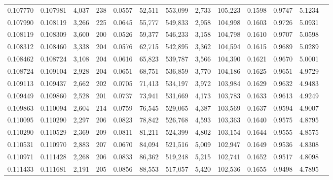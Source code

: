 \begin{tabular}{rrrrrrrrrrrrr}
0.107770 & 0.107981 & 4,037 & 238 &                                     0.0557 &  52,511 & 553,099 &   2,733 & 105,223 & 0.1598 & 0.9747 & 5.1234 \\
0.107990 & 0.108119 & 3,266 & 225 &                                     0.0645 &  55,777 & 549,833 &   2,958 & 104,998 & 0.1603 & 0.9726 & 5.0931 \\
0.108119 & 0.108309 & 3,600 & 200 &                                     0.0526 &  59,377 & 546,233 &   3,158 & 104,798 & 0.1610 & 0.9707 & 5.0598 \\
0.108312 & 0.108460 & 3,338 & 204 &                                     0.0576 &  62,715 & 542,895 &   3,362 & 104,594 & 0.1615 & 0.9689 & 5.0289 \\
0.108462 & 0.108724 & 3,108 & 204 &                                     0.0616 &  65,823 & 539,787 &   3,566 & 104,390 & 0.1621 & 0.9670 & 5.0001 \\
0.108724 & 0.109104 & 2,928 & 204 &                                     0.0651 &  68,751 & 536,859 &   3,770 & 104,186 & 0.1625 & 0.9651 & 4.9729 \\
0.109113 & 0.109437 & 2,662 & 202 &                                     0.0705 &  71,413 & 534,197 &   3,972 & 103,984 & 0.1629 & 0.9632 & 4.9483 \\
0.109449 & 0.109860 & 2,528 & 201 &                                     0.0737 &  73,941 & 531,669 &   4,173 & 103,783 & 0.1633 & 0.9613 & 4.9249 \\
0.109863 & 0.110094 & 2,604 & 214 &                                     0.0759 &  76,545 & 529,065 &   4,387 & 103,569 & 0.1637 & 0.9594 & 4.9007 \\
0.110095 & 0.110290 & 2,297 & 206 &                                     0.0823 &  78,842 & 526,768 &   4,593 & 103,363 & 0.1640 & 0.9575 & 4.8795 \\
0.110290 & 0.110529 & 2,369 & 209 &                                     0.0811 &  81,211 & 524,399 &   4,802 & 103,154 & 0.1644 & 0.9555 & 4.8575 \\
0.110531 & 0.110970 & 2,883 & 207 &                                     0.0670 &  84,094 & 521,516 &   5,009 & 102,947 & 0.1649 & 0.9536 & 4.8308 \\
0.110971 & 0.111428 & 2,268 & 206 &                                     0.0833 &  86,362 & 519,248 &   5,215 & 102,741 & 0.1652 & 0.9517 & 4.8098 \\
0.111433 & 0.111681 & 2,191 & 205 &                                     0.0856 &  88,553 & 517,057 &   5,420 & 102,536 & 0.1655 & 0.9498 & 4.7895 \\

\end{tabular}

